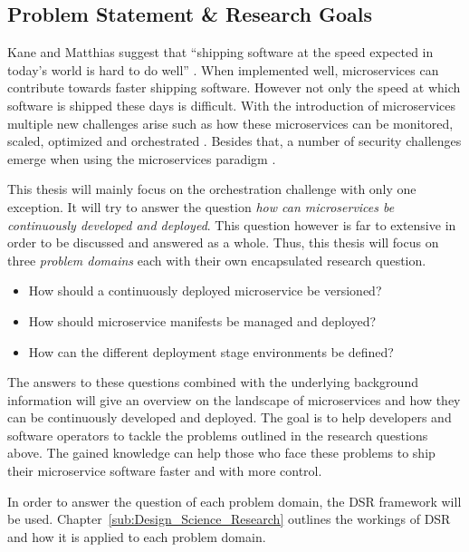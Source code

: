 
\subsection{Problem Statement \& Research Goals}%
\label{sub:Problem_Statement}

Kane and Matthias suggest that \enquote{shipping software at the speed expected
in today's world is hard to do well} \autocite[p.
2]{SeanPKaneDocker&Running2018}. When implemented well, microservices can
contribute towards faster shipping software. However not only the speed at
which software is shipped these days is difficult. With the introduction of
microservices multiple new challenges arise such as how these microservices can
be monitored, scaled, optimized and orchestrated \autocite[p.
67]{TrihinasDevOpsasService2018}. Besides that, a number of security challenges
emerge when using the microservices paradigm
\autocite{YaryginaOvercomingSecurityChallenges2018}.

This thesis will mainly focus on the orchestration challenge with only one
exception. It will try to answer the question \textit{how can microservices be
continuously developed and deployed}. This question however is far to extensive
in order to be discussed and answered as a whole. Thus, this thesis will focus
on three  \textit{problem domains} each with their own encapsulated research
question.

\label{link:problem_domains}
\begin{itemize}
  \item How should a continuously deployed microservice be versioned?
  \item How should microservice manifests be managed and deployed?
  \item How can the different deployment stage environments be defined?
\end{itemize}

The answers to these questions combined with the underlying background
information will give an overview on the landscape of microservices and how
they can be continuously developed and deployed. The goal is to help developers
and software operators to tackle the problems outlined in the research
questions above. The gained knowledge can help those who face these problems to
ship their microservice software faster and with more control.

In order to answer the question of each problem domain, the \ac{DSR} framework
will be used. Chapter~\ref{sub:Design_Science_Research} outlines the workings
of \ac{DSR} and how it is applied to each problem domain.
